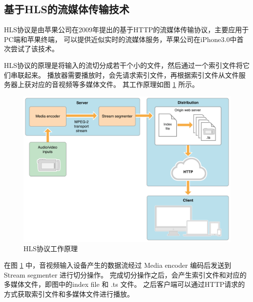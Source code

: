 
\subsection{基于HLS的流媒体传输技术}
HLS协议是由苹果公司在2009年提出的基于HTTP的流媒体传输协议，主要应用于PC端和苹果终端，
可以提供近似实时的流媒体服务，苹果公司在iPhone3.0中首次尝试了该技术\cite{魏雪飞2020HLS,曾清0基于}。

HLS协议的原理是将输入的流切分成若干个小的文件，然后通过一个索引文件将它们串联起来。
播放器需要播放时，会先请求索引文件，再根据索引文件从文件服务器上获对应的音视频等多媒体文件。
其工作原理如图 \ref{Fig:hls} 所示。

\newpage
\begin{figure}[ht]
    \centering
    \includegraphics[width=1\linewidth]{./Figure/IMG_hls.png}
    \caption{HLS协议工作原理}
    \label{Fig:hls}
\end{figure}

在图  \ref{Fig:hls} 中，音视频输入设备产生的数据流经过 Media encoder 编码后发送到 Stream segmenter 
进行切分操作。
完成切分操作之后，会产生索引文件和对应的多媒体文件，即图中的index file 和 .ts 文件。
之后客户端可以通过HTTP请求的方式获取索引文件和多媒体文件进行播放。




